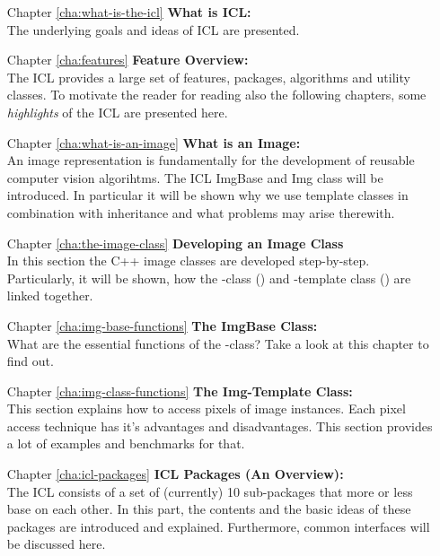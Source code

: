 \begin{itemize}
\item [Chapter \ref{cha:what-is-the-icl}] \textbf{What is ICL:}\\ The underlying goals and ideas of ICL are presented. 
\item [Chapter \ref{cha:features}] \textbf{Feature Overview:}\\ The ICL provides a large set of features, packages, algorithms and utility classes. To motivate the reader for reading also the following chapters, some \emph{highlights} of the ICL are presented here.
\item [Chapter \ref{cha:what-is-an-image}] \textbf{What is an Image:}\\ An image representation is fundamentally for the development of reusable computer vision algorihtms. The ICL ImgBase  and Img  class will be introduced. In particular it will be shown why we use template classes in combination with inheritance and what problems may arise therewith. 
\item [Chapter \ref{cha:the-image-class}]\textbf{Developing an Image Class}\\
In this section the C++ image classes are developed step-by-step. Particularly, it will be shown, how the -class () and -template class () are linked together. 
\item [Chapter \ref{cha:img-base-functions}]\textbf{The ImgBase Class:}\\
What are the essential functions of the -class? Take a look at this chapter to find out.
\item [Chapter \ref{cha:img-class-functions}]\textbf{The Img-Template Class:}\\
This section explains how to access pixels of image instances. Each pixel access technique has it's advantages and disadvantages. This section provides a lot of examples and benchmarks for that.
\item [Chapter \ref{cha:icl-packages}]\textbf{ICL Packages (An Overview):}\\ The ICL consists of a set of (currently) 10 sub-packages that more or less base on each other. In this part, the contents and the basic ideas of these packages are introduced and explained. Furthermore, common interfaces will be discussed here.

\end{itemize}
